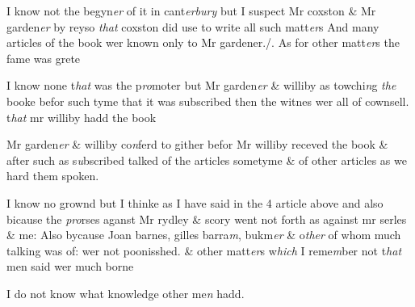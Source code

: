 \documentclass[12pt, a4paper]{book}
\begin{document}
            		
				\marginpar[\vspace{0.5cm}{\textcolor{Gray}{1}}]{}
			
            		
		\ifthenelse{\isodd{\thepage}}
		{\reversemarginpar}
		{\normalmarginpar}
		I know not the begyn\textit{er} of it in cant\textit{erbury} but I suspect Mr coxston \& Mr garden\textit{er} by 
 reyso \textit{that} coxston did use to write all such matt\textit{er}s And many articles of the 
book wer known only to Mr gardener./. As for other matt\textit{er}s the fame was grete
		
				\marginpar[\vspace{0.5cm}{\textcolor{Gray}{2}}]{}
			
            		
			
            		
		\ifthenelse{\isodd{\thepage}}
		{\reversemarginpar}
		{\normalmarginpar}
		I know none t\textit{hat} was the p\textit{ro}moter but Mr garden\textit{er} \& williby as towchi\textit{n}g \textit{the} booke
 befor such tyme that it was subscribed then the witnes wer all of cownsell.
t\textit{hat} mr williby hadd the book
            		
				\marginpar[\vspace{0.5cm}{\textcolor{Gray}{3}}]{}
			

		\ifthenelse{\isodd{\thepage}}
		{\reversemarginpar}
		{\normalmarginpar}
		Mr garden\textit{er} \& williby co\textit{n}ferd to gither befor Mr williby receved the book \& after 
 such as s\textit{u}bscribed talked of the articles sometyme \& of other articles as we 
hard them spoken.
            		
				\marginpar[\vspace{0.5cm}{\textcolor{Gray}{4}}]{}
			

		\ifthenelse{\isodd{\thepage}}
		{\reversemarginpar}
		{\normalmarginpar}
		I know no grownd but I thinke as I have said in the 4 article above and
 also bicause the \textit{pro}rses aganst Mr rydley \& scory went not forth as against 
mr serles \& me: Also bycause Joan barnes, gilles barra\textit{m}, bukm\textit{er} \& o\textit{ther} of whom
much talking was of: wer not poonisshed. \& other matt\textit{er}s w\textit{hich} I reme\textit{m}ber not t\textit{hat}
men said wer much borne

				\marginpar[\vspace{0.5cm}{\textcolor{Gray}{5}}]{}
			
		\ifthenelse{\isodd{\thepage}}
		{\reversemarginpar}
		{\normalmarginpar}
		I do not know what knowledge other me\textit{n} hadd.
		
\end{document}
